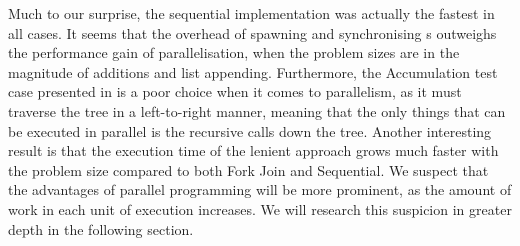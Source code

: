 Much to our surprise, the sequential implementation was actually the fastest in all cases. It seems that the overhead of spawning and synchronising s outweighs the performance gain of parallelisation, when the problem sizes are in the magnitude of additions and list appending. Furthermore, the Accumulation test case presented in \cite{DBLP:journals/cl/Tremblay-parallel} is a poor choice when it comes to parallelism, as it must traverse the tree in a left-to-right manner, meaning that the only things that can be executed in parallel is the recursive calls down the tree. Another interesting result is that the execution time of the lenient approach grows much faster with the problem size compared to both Fork Join and Sequential. We suspect that the advantages of parallel programming will be more prominent, as the amount of work in each unit of execution increases. We will research this suspicion in greater depth in the following section.